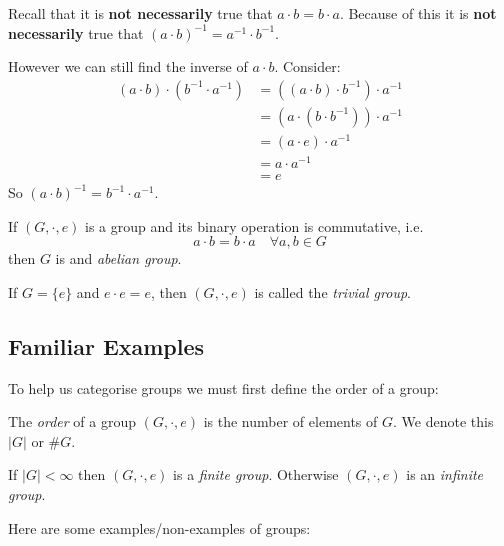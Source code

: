 \documentclass[../main.tex]{subfiles}
\begin{document}
\begin{remark}[Warning]
Recall that it is \textbf{not necessarily} true that $a \cdot b = b \cdot a$.
Because of this it is \textbf{not necessarily} true that $(a \cdot b)^{-1} = a^{-1} \cdot b^{-1}$.
\end{remark}
However we can still find the inverse of $a \cdot b$.
Consider:
\begin{align*}
  (a \cdot b) \cdot (b^{-1} \cdot a^{-1}) &= \left((a \cdot b) \cdot b^{-1}\right) \cdot a^{-1} \\
                                          &= \left(a \cdot (b \cdot b^{-1})\right) \cdot a^{-1} \\
                                          &= (a \cdot e) \cdot a^{-1} \\
                                          &= a \cdot a^{-1} \\
                                          &= e
\end{align*}
So $(a \cdot b)^{-1} = b^{-1} \cdot a^{-1}$.
\begin{definition}
  If $(G, \cdot, e)$ is a group and its binary operation is commutative, i.e.
  \[
    a \cdot b = b \cdot a \quad \forall a, b \in G
  \]
  then $G$ is and \textit{abelian group}.
\end{definition}
\begin{example}
  If $G = \{ e \}$ and $e \cdot e = e$, then $(G, \cdot, e)$ is called the \textit{trivial group}.
\end{example}

\subsection{Familiar Examples}
To help us categorise groups we must first define the order of a group:
\begin{definition}
  The \textit{order} of a group $(G, \cdot, e)$  is the number of elements of $G$.
  We denote this $|G|$ or $\#G$.
\end{definition}
\begin{definition}
  If $|G| < \infty$ then $(G, \cdot, e)$ is a \textit{finite group}.
  Otherwise $(G, \cdot, e)$ is an \textit{infinite group}.
\end{definition}
Here are some examples/non-examples of groups:
\end{document}
